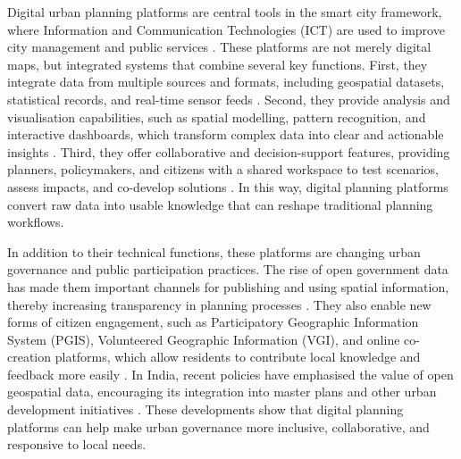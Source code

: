 \documentclass[
  12pt,
  oneside]{book}
\begin{document}
Digital urban planning platforms are central tools in the smart city framework, where Information and Communication Technologies (ICT) are used to improve city management and public services \autocite{przybyszIntegratingCityMaster2024}. These platforms are not merely digital maps, but integrated systems that combine several key functions. First, they integrate data from multiple sources and formats, including geospatial datasets, statistical records, and real-time sensor feeds \autocite{anttiroikoDigitalUrbanPlanning2021}. Second, they provide analysis and visualisation capabilities, such as spatial modelling, pattern recognition, and interactive dashboards, which transform complex data into clear and actionable insights \autocite{repetteEvolutionCityasaPlatformSmart2021}. Third, they offer collaborative and decision-support features, providing planners, policymakers, and citizens with a shared workspace to test scenarios, assess impacts, and co-develop solutions \autocite{anttiroikoDigitalUrbanPlanning2021}. In this way, digital planning platforms convert raw data into usable knowledge that can reshape traditional planning workflows.

In addition to their technical functions, these platforms are changing urban governance and public participation practices. The rise of open government data has made them important channels for publishing and using spatial information, thereby increasing transparency in planning processes \autocite{parasaEmbedOpenData2021}. They also enable new forms of citizen engagement, such as Participatory Geographic Information System (PGIS), Volunteered Geographic Information (VGI), and online co-creation platforms, which allow residents to contribute local knowledge and feedback more easily \autocite{ddambaDataParticipationParticipation2015,haslerDigitalToolsMeans2017}. In India, recent policies have emphasised the value of open geospatial data, encouraging its integration into master plans and other urban development initiatives \autocite{parasaEmbedOpenData2021}. These developments show that digital planning platforms can help make urban governance more inclusive, collaborative, and responsive to local needs.
\end{document}

